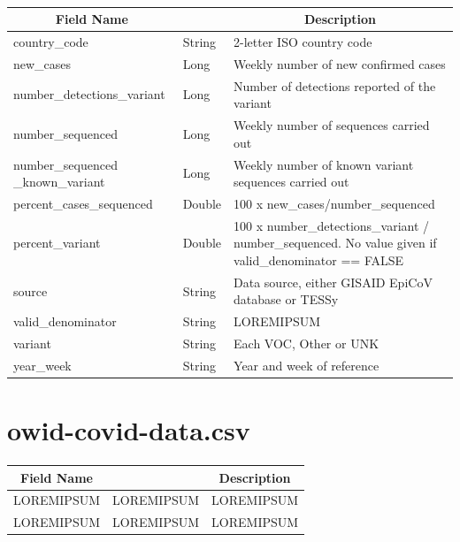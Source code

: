 \documentclass[a4paper,12pt]{article}
\begin{document}
\paragraph{}
\begin{center}
\begin{tabular}{|m{45mm}|>{\raggedright}m{16mm}|m{75mm}|}
\hline
\multicolumn{1}{|c|}{\textbf{ Field Name }}
& \multicolumn{1}{c|}{\textbf{ Data Type }} 
    	& \multicolumn{1}{c|}{\textbf{ Description }}\\
\hline
country\_code & String & 2-letter ISO country code \\
\hline
new\_cases & Long & Weekly number of new confirmed cases \\
\hline
number\_detections\_variant & Long & Number of detections reported of the variant \\
\hline
number\_sequenced & Long & Weekly number of sequences carried out \\
\hline
number\_sequenced \_known\_variant & Long & Weekly number of known variant sequences carried out \\
\hline
percent\_cases\_sequenced & Double & 100 x new\_cases/number\_sequenced \\
\hline
percent\_variant & Double & 100 x number\_detections\_variant / number\_sequenced. No value given if valid\_denominator == FALSE\\
\hline
source & String & Data source, either GISAID EpiCoV database or TESSy \\
\hline
valid\_denominator & String & LOREMIPSUM \\
\hline
variant & String & Each VOC, Other or UNK \\
\hline
year\_week & String & Year and week of reference \\
\hline
\end{tabular}
\end{center}
\newpage

\section{owid-covid-data.csv}
\paragraph{}
\begin{center}
\begin{tabular}{|m{45mm}|>{\raggedright}m{16mm}|m{75mm}|}
\hline
\multicolumn{1}{|c|}{\textbf{ Field Name }}
& \multicolumn{1}{c|}{\textbf{ Data Type }} 
    	& \multicolumn{1}{c|}{\textbf{ Description }}\\

\hline
LOREMIPSUM & LOREMIPSUM & LOREMIPSUM \\
\hline
LOREMIPSUM & LOREMIPSUM & LOREMIPSUM \\
\hline
\end{tabular}
\end{center}
\end{document}

